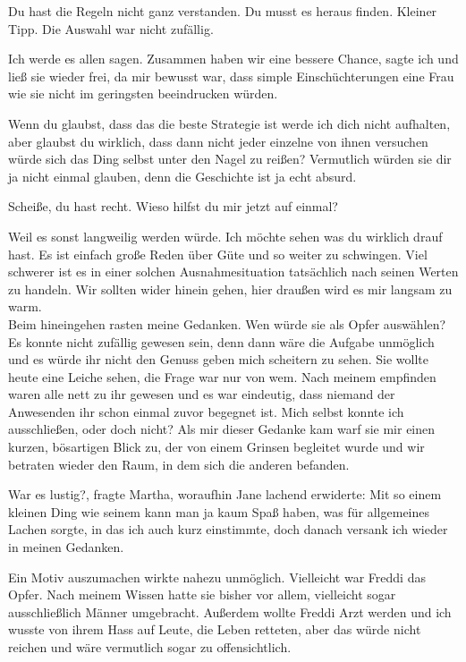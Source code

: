 \documentclass[11pt, a5paper]{article}
\newcommand{\te}{Jane } %
\newcommand{\Gf}{Martha}
\newcommand{\fr}{Freddi } %
\begin{document}
\begin{spacing}{1.2}
		\frqq Du hast die Regeln nicht ganz verstanden. Du musst es heraus finden. Kleiner Tipp. Die Auswahl war nicht zufällig.\flqq
		
		\frqq Ich werde es allen sagen. Zusammen haben wir eine bessere Chance\flqq , sagte ich und ließ sie wieder frei, da mir bewusst war, dass simple Einschüchterungen eine Frau wie sie nicht im geringsten beeindrucken würden.
		
		\frqq Wenn du glaubst, dass das die beste Strategie ist werde ich dich nicht aufhalten, aber glaubst du wirklich, dass dann nicht jeder einzelne von ihnen versuchen würde sich das Ding selbst unter den Nagel zu reißen? Vermutlich würden sie dir ja nicht einmal glauben, denn die Geschichte ist ja echt absurd.\flqq
		
		\frqq Scheiße, du hast recht. Wieso hilfst du mir jetzt auf einmal?\flqq
		
		\frqq Weil es sonst langweilig werden würde. Ich möchte sehen was du wirklich drauf hast. Es ist einfach große Reden über Güte und so weiter zu schwingen. Viel schwerer ist es in einer solchen Ausnahmesituation tatsächlich nach seinen Werten zu handeln. Wir sollten wider hinein gehen, hier draußen wird es mir langsam zu warm.\flqq\\
		
		Beim hineingehen rasten meine Gedanken. Wen würde sie als Opfer auswählen? Es konnte nicht zufällig gewesen sein, denn dann wäre die Aufgabe unmöglich und es würde ihr nicht den Genuss geben mich scheitern zu sehen. Sie wollte heute eine Leiche sehen, die Frage war nur von wem. Nach meinem empfinden waren alle nett zu ihr gewesen und es war eindeutig, dass niemand der Anwesenden ihr schon einmal zuvor begegnet ist. Mich selbst konnte ich ausschließen, oder doch nicht? Als mir dieser Gedanke kam warf sie mir einen kurzen, bösartigen Blick zu, der von einem Grinsen begleitet wurde und wir betraten wieder den Raum, in dem sich die anderen befanden.
		
		\frqq War es lustig?\flqq , fragte \Gf , woraufhin \te lachend erwiderte: \frqq Mit so einem kleinen Ding wie seinem kann man ja kaum Spaß haben\flqq , was für allgemeines Lachen sorgte, in das ich auch kurz einstimmte, doch danach versank ich wieder in meinen Gedanken.
		
		Ein Motiv auszumachen wirkte nahezu unmöglich. Vielleicht war \fr das Opfer. Nach meinem Wissen hatte sie bisher vor allem, vielleicht sogar ausschließlich Männer umgebracht. Außerdem wollte \fr Arzt werden und ich wusste von ihrem Hass auf Leute, die Leben retteten, aber das würde nicht reichen und wäre vermutlich sogar zu offensichtlich.
		

\end{spacing}
\end{document}
